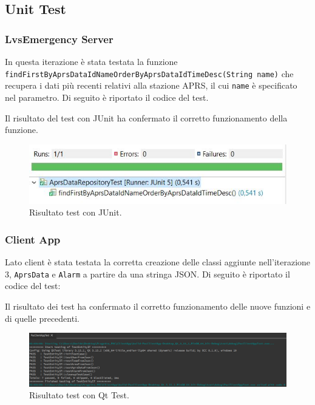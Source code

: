 \clearpage

\subsection{Unit Test}
\subsubsection{LvsEmergency Server}
In questa iterazione è stata testata la funzione \texttt{findFirstByAprsDataIdNameOrderByAprsDataIdTimeDesc(String name)} che recupera i dati più recenti relativi alla stazione APRS, il cui \texttt{name} è specificato nel parametro. Di seguito è riportato il codice del test.



Il risultato del test con JUnit ha confermato il corretto funzionamento della funzione.

\begin{figure}[h!]
	\centering
	\includegraphics[width=0.6\linewidth]{./Iterazione 3/ImageFiles/TestJUnit}
	\caption{Risultato test con JUnit.}
	\label{fig:RisultatiTestJunitIT3}
\end{figure}

\clearpage

\subsubsection{Client App}
Lato client è stata testata la corretta creazione delle classi aggiunte nell'iterazione 3, \texttt{AprsData} e \texttt{Alarm} a partire da una stringa JSON. Di seguito è riportato il codice del test: 



Il risultato dei test ha confermato il corretto funzionamento delle nuove funzioni e di quelle precedenti. 

\begin{figure}[h!]
	\centering
	\includegraphics[width=1\linewidth]{./Iterazione 3/ImageFiles/testQt}
	\caption{Risultato test con Qt Test.}
	\label{fig:RisultatiTestQtIT3}
\end{figure}


